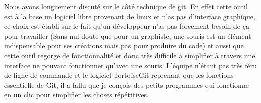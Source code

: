 Nous avons longuement discuté sur le côté technique de git. En effet cette
outil est à la base un logiciel libre provenant de linux et n'as pas
d'interface graphique, ce choix est établi sur le fait qu'un développeur n'as
pas forcement besoin de ça pour travailler (Sans nul doute que pour un
graphiste, une souris est un élément indispensable pour ses créations mais pas
pour produire du code) et aussi que cette outil regorge de fonctionnalité et
donc très difficile à simplifier à travers une interface ne pouvant fonctionner
qu'avec une souris. L'équipe n'étant pas très féru de ligne de commande et le
logiciel TortoiseGit reprenant que les fonctions éssentielle de Git, il a fallu
que je conçois des petits programmes qui fonctionne en un clic pour simplifier
les choses répétitives.

\clearpage
